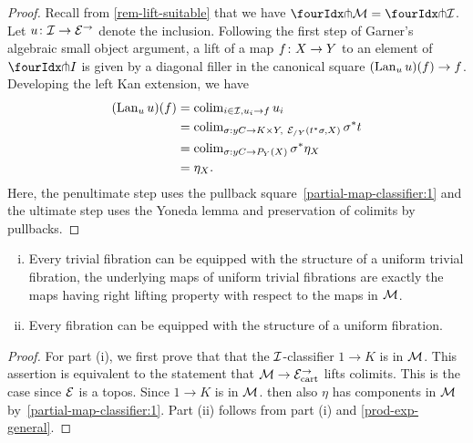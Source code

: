\documentclass[reqno,10pt,a4paper,oneside,draft]{amsart}
\begin{document}
{{\begin{proof} 
Recall from \cref{rem-lift-suitable} that we have $\liftr{\cal{M}} = \liftr{\cal{I}}$.
Let $u \co \cal{I} \to \cal{E}^\to$ denote the inclusion.
Following the first step of Garner's algebraic small object argument, a lift of a map $f \co X \to Y$ to an element of $\liftr{I}$ is given by a diagonal filler in the canonical square $(\Lan_u u)(f) \to f$.
Developing the left Kan extension, we have
\begin{align*}
(\Lan_u u)(f)
&=
\colim_{i \in \cal{I}, u_i \to f} u_i
\\&=
\colim_{\sigma : y C \to K \times Y,\ \cal{E}_{/Y}(t^* \sigma, X)} \sigma^* t
\\&=
\colim_{\sigma : y C \to P_Y(X)} \sigma^* \eta_X
\\&=
\eta_X
.
\end{align*}
Here, the penultimate step uses the pullback square~\eqref{partial-map-classifier:1} and the ultimate step uses the Yoneda lemma and preservation of colimits by pullbacks.
\end{proof} 


\begin{theorem} \label{unif-vs-non-unif} \hfill 
\begin{enumerate}[(i)] 
\item  Every trivial fibration can be equipped with the structure of a uniform trivial fibration, \ie
the underlying maps of uniform trivial fibrations are exactly the maps having right lifting property with respect to 
the maps in $\cal{M}$.
\item Every fibration can be equipped with the structure of a uniform  fibration.
\end{enumerate}
\end{theorem} 

\begin{proof} For part (i), we first prove that that the $\cal{I}$-classifier $1 \to K$ is  in $\cal{M}$.
This assertion is equivalent to the statement that $\cal{M} \to \cal{E}^\to_{\cart}$ lifts colimits.
This is the case since $\cal{E}$ is a topos.
Since  $1 \to K$ is  in $\cal{M}$.  then also $\eta$ has components in $\cal{M}$ by~\eqref{partial-map-classifier:1}.
Part (ii) follows from part (i) and \cref{prod-exp-general}.
\end{proof} 


}}
\end{document}
